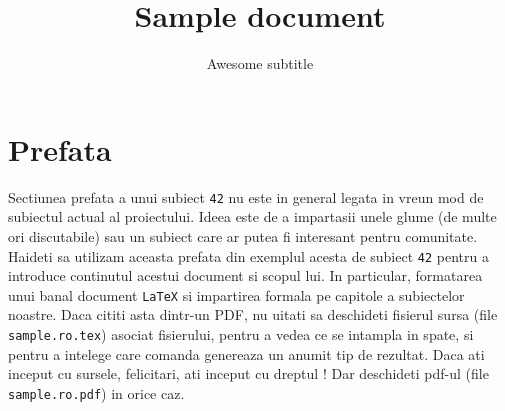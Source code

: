 \documentclass{42-en}
\begin{document}
                           \title{Sample document}
                          \subtitle{Awesome subtitle}


\maketitle

\tableofcontents


\chapter{Prefata}

    Sectiunea prefata a unui subiect \texttt{42} nu este in general
    legata in vreun mod de subiectul actual al proiectului. Ideea este
    de a impartasii unele glume (de multe ori discutabile) sau un subiect
    care ar putea fi interesant pentru comunitate.\\










    Haideti sa utilizam aceasta prefata din exemplul acesta de subiect
    \texttt{42} pentru a introduce continutul acestui document si
    scopul lui. In particular, formatarea unui banal document
    \texttt{LaTeX} si impartirea formala pe capitole a subiectelor
    noastre. Daca cititi asta dintr-un PDF, nu uitati sa deschideti
    fisierul sursa (file \texttt{sample.ro.tex}) asociat fisierului, pentru
    a vedea ce se intampla in spate, si pentru a intelege care comanda
    genereaza un anumit tip de rezultat. Daca ati inceput cu sursele,
    felicitari, ati inceput cu dreptul ! Dar deschideti pdf-ul (file
    \texttt{sample.ro.pdf}) in orice caz.\\
\end{document}
